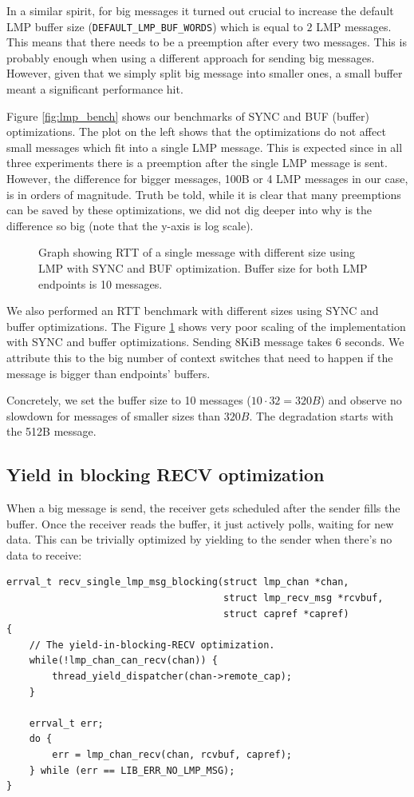 In a similar spirit, for big messages it turned out crucial to increase the default LMP buffer size (\texttt{DEFAULT_LMP_BUF_WORDS}) which is equal to $2$ LMP messages. This means that there needs to be a preemption after every two messages. This is probably enough when using a different approach for sending big messages. However, given that we simply split big message into smaller ones, a small buffer meant a significant performance hit.

Figure \ref{fig:lmp_bench} shows our benchmarks of SYNC and BUF (buffer) optimizations. The plot on the left shows that the optimizations do not affect small messages which fit into a single LMP message. This is expected since in all three experiments there is a preemption after the single LMP message is sent. However, the difference for bigger messages, 100B or 4 LMP messages in our case, is in orders of magnitude. Truth be told, while it is clear that many preemptions can be saved by these optimizations, we did not dig deeper into why is the difference so big (note that the y-axis is log scale). 

\begin{figure}[ht]
    \centering
        \scalebox{0.8}{}
    \caption{Graph showing RTT of a single message with different size using LMP with SYNC and BUF optimization. Buffer size for both LMP endpoints is 10 messages.}
    \label{fig:lmp_rttbad}
\end{figure}

We also performed an RTT benchmark with different sizes using SYNC and buffer optimizations. The Figure \ref{fig:lmp_rttbad} shows very poor scaling of the implementation with SYNC and buffer optimizations. Sending 8KiB message takes 6 seconds. We attribute this to the big number of context switches that need to happen if the message is bigger than endpoints' buffers.

Concretely, we set the buffer size to 10 messages ($10 \cdot 32 = 320B$) and observe no slowdown for messages of smaller sizes than $320B$. The degradation starts with the 512B message.

\subsection{Yield in blocking RECV optimization}
When a big message is send, the receiver gets scheduled after the sender fills the buffer. Once the receiver reads the buffer, it just actively polls, waiting for new data. This can be trivially optimized by yielding to the sender when there's no data to receive:
\begin{verbatim}
errval_t recv_single_lmp_msg_blocking(struct lmp_chan *chan,
                                      struct lmp_recv_msg *rcvbuf,
                                      struct capref *capref)
{
    // The yield-in-blocking-RECV optimization.
    while(!lmp_chan_can_recv(chan)) {
        thread_yield_dispatcher(chan->remote_cap);    
    }
    
    errval_t err;
    do {
        err = lmp_chan_recv(chan, rcvbuf, capref);
    } while (err == LIB_ERR_NO_LMP_MSG);
}
\end{verbatim}

